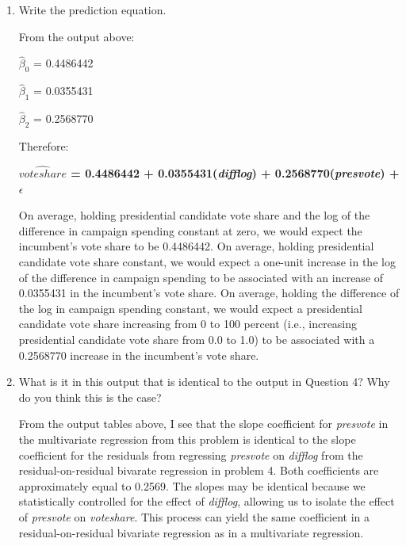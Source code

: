 \documentclass[12pt,letterpaper]{article}
\begin{document}
\begin{enumerate}
			The adjusted R-squaraed value is 0.4493, meaning that 44.93 percent of the variation in \textit{voteshare} can be explained by the variation in \textit{difflog} and \textit{presvote.}
		
		\item Write the prediction equation.	\vspace{0.5cm}
		
		From the output above:
		
		$\hat{\beta}_0$ = 0.4486442
		
		$\hat{\beta}_1$ = 0.0355431
		
		$\hat{\beta}_2$ = 0.2568770
		
		Therefore:
		
\textbf{		$\hat{voteshare}$ = 0.4486442 + 0.0355431(\textit{difflog}) + 0.2568770(\textit{presvote}) + $\epsilon$}
		
		On average, holding presidential candidate vote share and the log of the difference in campaign spending constant at zero, we would expect the incumbent's vote share to be 0.4486442. On average, holding presidential candidate vote share constant, we would expect a one-unit increase in the log of the difference in campaign spending to be associated with an increase of 0.0355431 in the incumbent's vote share. On average, holding the difference of the log in campaign spending constant, we would expect a presidential candidate vote share increasing from 0 to 100 percent  (i.e., increasing presidential candidate vote share from 0.0 to 1.0) to be associated with a 0.2568770 increase in the incumbent's vote share.
		
	\vspace{.5cm}	\item What is it in this output that is identical to the output in Question 4? Why do you think this is the case? \vspace{.5cm}
		
		From the output tables above, I see that the slope coefficient for \textit{presvote} in the multivariate regression from this problem is identical to the slope coefficient for the residuals from regressing \textit{presvote} on \textit{difflog} from the residual-on-residual bivarate regression in problem 4.  Both coefficients are approximately equal to 0.2569. The slopes may be identical because we statistically controlled for the effect of \textit{difflog}, allowing us to isolate the effect of \textit{presvote} on \textit{voteshare}. This process can yield the same coefficient in a residual-on-residual bivariate regression as in a multivariate regression.
		

\end{enumerate}
\end{document}
